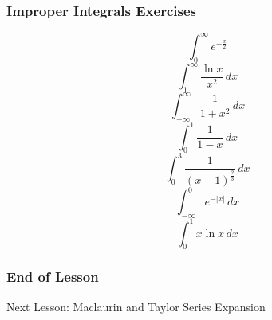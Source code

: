 \documentclass[xcolor=dvipsnames]{beamer}
\begin{document}
\begin{frame}
  \frametitle{Improper Integrals Exercises}
  \begin{equation}
    \label{eq:cheifiwo}
    \int_{0}^{\infty}e^{-\frac{x}{2}}
  \end{equation}
  \begin{equation}
    \label{eq:eiquiena}
    \int_{1}^{\infty}\frac{\ln{}x}{x^{2}}\,dx
  \end{equation}
  \begin{equation}
    \label{eq:yielohwi}
    \int_{-\infty}^{\infty}\frac{1}{1+x^{2}}\,dx
  \end{equation}
  \begin{equation}
    \label{eq:oocoibuo}
    \int_{0}^{1}\frac{1}{1-x}\,dx
  \end{equation}
  \begin{equation}
    \label{eq:eebaesie}
    \int_{0}^{3}\frac{1}{(x-1)^{\frac{2}{3}}}\,dx
  \end{equation}
  \begin{equation}
    \label{eq:aezihuth}
    \int_{-\infty}^{0}e^{-|x|}\,dx
  \end{equation}
  \begin{equation}
    \label{eq:wiexohje}
    \int_{0}^{1}x\ln{}x\,dx
  \end{equation}
\end{frame}

\begin{frame}
  \frametitle{End of Lesson}
Next Lesson: Maclaurin and Taylor Series Expansion
\end{frame}
\end{document}

